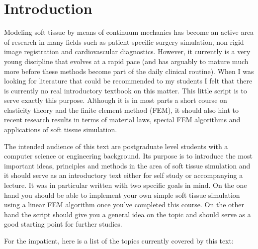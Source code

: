 

\chapter{Introduction}
Modeling soft tissue by means of continuum mechanics has become an active area of research in many fields such as patient-specific surgery simulation, non-rigid image registration and cardiovascular diagnostics. However, it currently is a very young discipline that evolves at a rapid pace (and has arguably to mature much more before these methods become part of the daily clinical routine). When I was looking for literature that could be recommended to my students I felt that there is currently no real introductory textbook on this matter. This little script is to serve exactly this purpose. Although it is in most parts a short course on elasticity theory and the finite element method (FEM), it should also hint to recent research results in terms of material laws, special FEM algorithms and applications of soft tissue simulation.

The intended audience of this text are postgraduate level students with a computer science or engineering background. Its purpose is to introduce the most important ideas, principles and methods in the area of soft tissue simulation and it should serve as an introductory text either for self study or accompanying a lecture. It was in particular written with two specific goals in mind. On the one hand you should be able to implement your own simple soft tissue simulation using a linear FEM algorithm once you've completed this course. On the other hand the script should give you a general idea on the topic and should serve as a good starting point for further studies. 

For the impatient, here is a list of the topics currently covered by this text:

